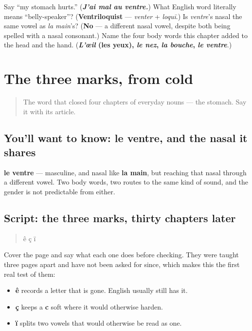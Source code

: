 \begin{tcolorbox}[breakable,colback=teal!4,colframe=teal!35!black,title={Before you move on}]
Say \textquotedblleft{}my stomach hurts.\textquotedblright{} (\emph{\textbf{J'ai mal au ventre.}}) What English word literally means \textquotedblleft{}belly-speaker\textquotedblright{}? (\textbf{Ventriloquist} — \emph{venter} + \emph{loquī}.) Is \emph{ventre}'s nasal the same vowel as \emph{la main}'s? (\textbf{No} — a different nasal vowel, despite both being spelled with a nasal consonant.) Name the four body words this chapter added to the head and the hand. (\textbf{\emph{L'œil} (les yeux), \emph{le nez}, \emph{la bouche}, \emph{le ventre}}.)
\end{tcolorbox}
\section[le ventre]{The three marks, from cold}

\label{lesson:FR-R35-second-pass-marks-from-cold}



\begin{quote}
The word that closed four chapters of everyday nouns — the stomach. Say it with its article.
\end{quote}

\subsection*{You'll want to know: le ventre, and the nasal it shares}
\textbf{le ventre} — masculine, and nasal like \textbf{la main}, but reaching that nasal through a different vowel. Two body words, two routes to the same kind of sound, and the gender is not predictable from either.

\subsection*{Script: the three marks, thirty chapters later}
\begin{quote}
ê  ç  ï
\end{quote}

Cover the page and say what each one does before checking. They were taught three pages apart and have not been asked for since, which makes this the first real test of them:

\begin{itemize}
\raggedright
  \item \textbf{ê} records a letter that is gone. English usually still has it.
  \item \textbf{ç} keeps a \textbf{c} soft where it would otherwise harden.
  \item \textbf{ï} splits two vowels that would otherwise be read as one.
\end{itemize}

